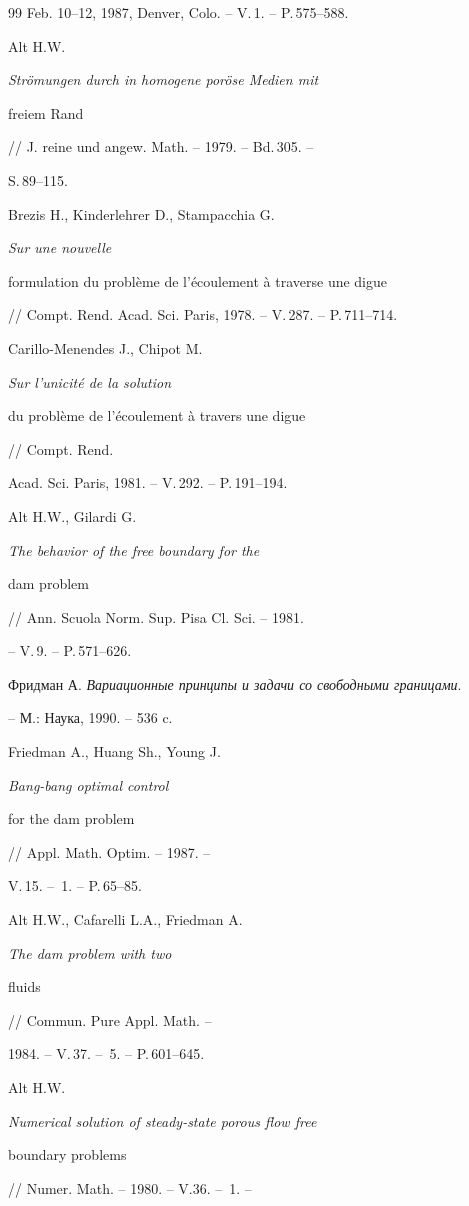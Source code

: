\begin{thebibliography}{99}
Feb. 10--12, 1987, Denver, Colo. -- V.\,1. -- P.\,575--588.




Alt H.W. {\em Str\"omungen durch in homogene por\"ose Medien mit


freiem Rand} // J. reine und angew. Math. -- 1979. -- Bd.\,305. --


S.\,89--115.




Brezis H., Kinderlehrer D., Stampacchia G. {\em Sur une nouvelle


formulation du probl\`eme de l'\'ecoulement \`a traverse une digue}


// Compt. Rend. Acad. Sci. Paris, 1978. -- V.\,287. -- P.\,711--714.




Carillo-Menendes J., Chipot M. {\em Sur l'unicit\'e de la solution


du probl\`eme de l'\'ecoulement \`a travers une digue} // Compt. Rend.


Acad. Sci. Paris, 1981. -- V.\,292. -- P.\,191--194.




Alt H.W., Gilardi G. {\em The behavior of the free boundary for the


dam problem} // Ann. Scuola Norm. Sup. Pisa Cl. Sci. -- 1981.


-- V.\,9. -- P.\,571--626.




Фридман А. {\em Вариационные принципы и задачи со свободными границами}.


-- М.: Наука, 1990. -- 536 c.




Friedman A., Huang Sh., Young J. {\em Bang-bang optimal control


for the dam problem} // Appl. Math. Optim. -- 1987. --


V.\,15. -- \No\,1. -- P.\,65--85.




Alt H.W., Cafarelli L.A., Friedman A. {\em The dam problem with two


fluids} // Commun. Pure Appl. Math. --


1984. -- V.\,37. -- \No\,5. -- P.\,601--645.




Alt H.W. {\em Numerical solution of steady-state porous flow free


boundary problems} // Numer. Math. -- 1980. -- V.36. -- \No\,1. --



\end{thebibliography}
